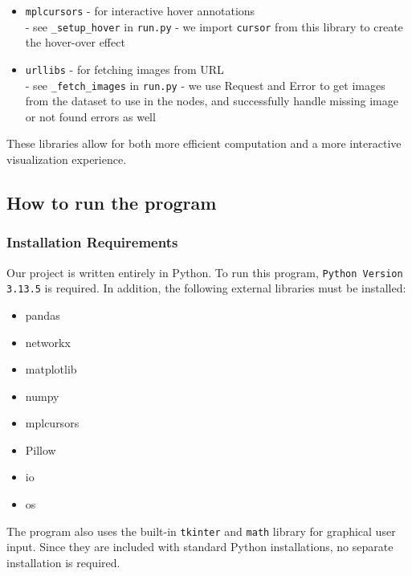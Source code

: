 \documentclass{article}
\begin{document}
\begin{itemize}
    \item \texttt{mplcursors} - for interactive hover annotations \\
    - see \texttt{\_setup\_hover} in \texttt{run.py}
    - we import \texttt{cursor} from this library to create the hover-over effect

    \item \texttt{urllibs} - for fetching images from URL \\
    - see \texttt{\_fetch\_images} in \texttt{run.py}
    - we use Request and Error to get images from the dataset to use in the nodes, and successfully handle missing image or not found errors as well
\end{itemize}
These libraries allow for both more efficient computation and a more interactive visualization experience. \\

\subsection{How to run the program}
\subsubsection{Installation Requirements}
Our project is written entirely in Python. To run this program, \texttt{Python Version 3.13.5} is required. In addition, the following external libraries must be installed:
\begin{itemize}
    \item pandas
    \item networkx
    \item matplotlib
    \item numpy
    \item mplcursors
    \item Pillow
    \item io
    \item os
\end{itemize} 
The program also uses the built-in \texttt{tkinter} and \texttt{math} library for graphical user input. Since they are included with standard Python installations, no separate installation is required.
\end{document}
